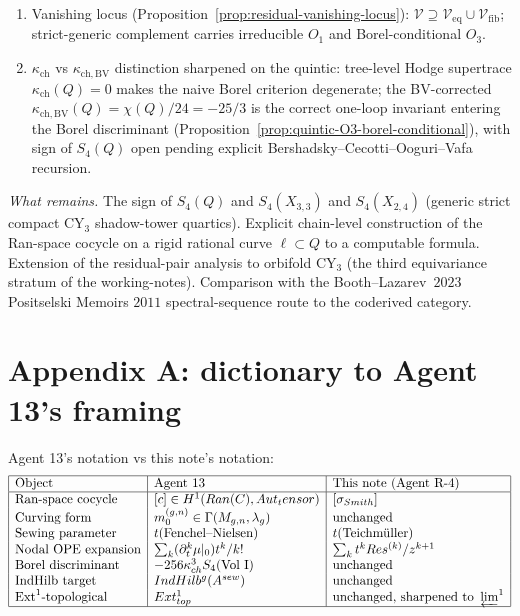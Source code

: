 \documentclass[11pt]{amsart}
\newcommand{\kch}{\kappa_{\mathrm{ch}}}
\newcommand{\kchBV}{\kappa_{\mathrm{ch},\mathrm{BV}}}
\newcommand{\Ran}{\mathrm{Ran}}
\newcommand{\IndHilb}{\mathrm{IndHilb}}
\newcommand{\Mbar}{\overline{\mathcal{M}}}
\newcommand{\Ext}{\mathrm{Ext}}
\newcommand{\Aut}{\mathrm{Aut}}
\begin{document}
\begin{enumerate}[leftmargin=2em]
\item Vanishing locus (Proposition~\ref{prop:residual-vanishing-locus}):
$\mathcal V \supseteq \mathcal V_{\mathrm{eq}} \cup
\mathcal V_{\mathrm{fib}}$; strict-generic complement carries
irreducible $O_1$ and Borel-conditional $O_3$.

\item $\kch$ vs $\kchBV$ distinction sharpened on the quintic:
tree-level Hodge supertrace $\kch(Q) = 0$ makes the naive Borel
criterion degenerate; the BV-corrected $\kchBV(Q) = \chi(Q)/24 =
-25/3$ is the correct one-loop invariant entering the Borel
discriminant
(Proposition~\ref{prop:quintic-O3-borel-conditional}), with sign
of $S_4(Q)$ open pending explicit Bershadsky--Cecotti--Ooguri--Vafa
recursion.
\end{enumerate}

\emph{What remains.} The sign of $S_4(Q)$ and $S_4(X_{3, 3})$ and
$S_4(X_{2, 4})$ (generic strict compact CY$_3$ shadow-tower
quartics). Explicit chain-level construction of the Ran-space
cocycle on a rigid rational curve $\ell \subset Q$ to a
computable formula. Extension of the residual-pair analysis to
orbifold CY$_3$ (the third equivariance stratum of the
working-notes). Comparison with the Booth--Lazarev~$2023$
Positselski Memoirs $2011$ spectral-sequence route to the coderived
category.

\section{Appendix A: dictionary to Agent 13's framing}
\label{sec:appendix-A-agent-13}

Agent 13's notation vs this note's notation:
\[
\begin{array}{|l|l|l|}
\hline
\text{Object} & \text{Agent 13} & \text{This note (Agent R-4)} \\
\hline
\text{Ran-space cocycle} & [c] \in H^1(\Ran(C), \Aut_\otimes) &
[\sigma_{\mathrm{Smith}}] \\
\text{Curving form} & m_0^{(g, n)} \in \Gamma(\Mbar_{g, n}, \lambda_g) &
\text{unchanged} \\
\text{Sewing parameter} & t (\text{Fenchel--Nielsen}) & t (\text{Teichmüller}) \\
\text{Nodal OPE expansion} & \sum_k (\partial_t^k \mu|_0) t^k / k! &
\sum_k t^k \mathrm{Res}^{(k)} / z^{k+1} \\
\text{Borel discriminant} & -256 \kch^3 S_4 (\text{Vol I}) & \text{unchanged} \\
\text{IndHilb target} & \IndHilb^g(A^{\mathrm{sew}}) & \text{unchanged} \\
\text{Ext}^1\text{-topological} & \Ext^1_{\mathrm{top}} &
\text{unchanged, sharpened to } \varprojlim^1 \\
\hline
\end{array}
\]
\end{document}
